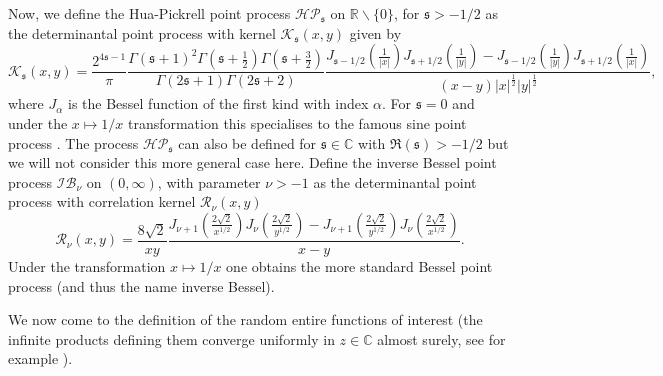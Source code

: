 \documentclass[]{article}
\begin{document}
Now, we define the Hua-Pickrell \cite{BorodinOlshanskiErgodic,ForresterWitteCauchy} point process $\mathcal{HP}_{\mathfrak{s}}$ on $\mathbb{R}\backslash\{0\}$, for $\mathfrak{s}>-1/2$ as the determinantal point process \cite{JohanssonDeterminantal,BorodinDeterminantal,ForresterLogGas}  with kernel $\mathcal{K}_\mathfrak{s}(x,y)$ given by
\begin{equation*}
\mathcal{K}_\mathfrak{s}(x,y)=\frac{2^{4\mathfrak{s}-1}}{\pi}\frac{\Gamma(\mathfrak{s}+1)^2\Gamma\left(\mathfrak{s}+\frac{1}{2}\right)\Gamma\left(\mathfrak{s}+\frac{3}{2}\right)}{\Gamma(2\mathfrak{s}+1)\Gamma(2\mathfrak{s}+2)}\frac{J_{\mathfrak{s}-1/2}\left(\frac{1}{|x|}\right)J_{\mathfrak{s}+1/2}\left(\frac{1}{|y|}\right)-J_{\mathfrak{s}-1/2}\left(\frac{1}{|y|}\right)J_{\mathfrak{s}+1/2}\left(\frac{1}{|x|}\right)}{(x-y)|x|^{\frac{1}{2}}|y|^\frac{1}{2}},
\end{equation*}
where $J_\alpha$ is the Bessel function of the first kind with index $\alpha$. For $\mathfrak{s}=0$ and under the $x\mapsto 1/x$ transformation this specialises to the famous sine point process \cite{ForresterLogGas}. The process $\mathcal{HP}_\mathfrak{s}$ can also be defined for $\mathfrak{s}\in \mathbb{C}$ with $\Re(\mathfrak{s})>-1/2$ but we will not consider this more general case here. Define the inverse Bessel point process $\mathcal{IB}_\nu$ on $(0,\infty)$, with parameter $\nu>-1$ as the determinantal point process with correlation kernel $\mathcal{R}_\nu(x,y)$
\begin{equation*}
\mathcal{R}_\nu(x,y)=\frac{8\sqrt{2}}{xy}\frac{J_{\nu+1}\left(\frac{2\sqrt{2}}{x^{1/2}}\right)J_{\nu}\left(\frac{2\sqrt{2}}{y^{1/2}}\right)-J_{\nu+1}\left(\frac{2\sqrt{2}}{y^{1/2}}\right)J_{\nu}\left(\frac{2\sqrt{2}}{x^{1/2}}\right)}{x-y}.
\end{equation*}
Under the transformation $x\mapsto 1/x$ one obtains the more standard Bessel point process \cite{ForresterBessel,ForresterLogGas} (and thus the name inverse Bessel). 

We now come to the definition of the random entire functions of interest (the infinite products defining them converge uniformly in $z\in \mathbb{C}$ almost surely, see for example \cite{Theo-RandomEntireFunctions}).
\end{document}
